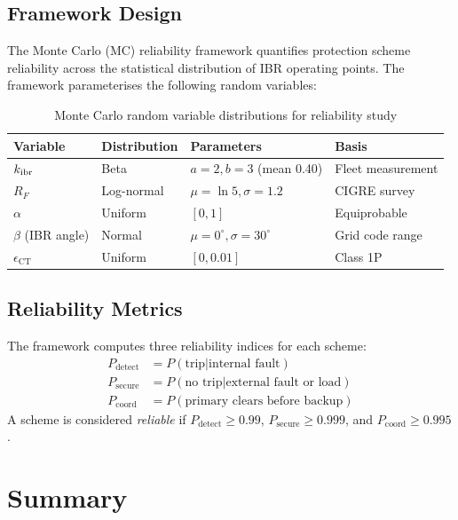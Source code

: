 \subsection{Framework Design}

The Monte Carlo (MC) reliability framework quantifies protection
scheme reliability across the statistical distribution of IBR operating points.
The framework parameterises the following random variables:

\begin{table}[htbp]
\caption{Monte Carlo random variable distributions for reliability study}
\label{tab:ch5_mc_params}
\begin{tabularx}{\textwidth}{@{}lXXX@{}}
\toprule
Variable & Distribution & Parameters & Basis \\
\midrule
$k_\mathrm{ibr}$ & Beta & $a=2, b=3$ (mean 0.40) & Fleet measurement \\
$R_F$ & Log-normal & $\mu=\ln 5, \sigma=1.2$ & CIGRE survey \\
$\alpha$ & Uniform & $[0, 1]$ & Equiprobable \\
$\beta$ (IBR angle) & Normal & $\mu=0^\circ{}, \sigma=30^\circ{}$ & Grid code range \\
$\epsilon_\mathrm{CT}$ & Uniform & $[0, 0.01]$ & Class 1P \\
\bottomrule
\end{tabularx}
\end{table}

\subsection{Reliability Metrics}

The framework computes three reliability indices for each scheme:
\begin{align}
  P_\mathrm{detect} &= P(\text{trip} | \text{internal fault})
  \label{eq:ch5_pdetect} \\
  P_\mathrm{secure} &= P(\text{no trip} | \text{external fault or load})
  \label{eq:ch5_psecure} \\
  P_\mathrm{coord} &= P(\text{primary clears before backup})
  \label{eq:ch5_pcoord}
\end{align}
A scheme is considered \emph{reliable} if $P_\mathrm{detect} \geq 0.99$,
$P_\mathrm{secure} \geq 0.999$, and $P_\mathrm{coord} \geq 0.995$.

\section{Summary}
\label{sec:ch7_summary}

